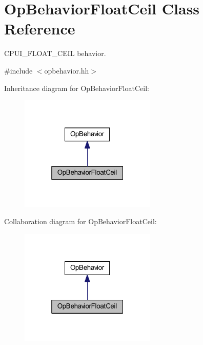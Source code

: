 \hypertarget{class_op_behavior_float_ceil}{}\section{Op\+Behavior\+Float\+Ceil Class Reference}
\label{class_op_behavior_float_ceil}


C\+P\+U\+I\+\_\+\+F\+L\+O\+A\+T\+\_\+\+C\+E\+IL behavior.  




{\ttfamily \#include $<$opbehavior.\+hh$>$}



Inheritance diagram for Op\+Behavior\+Float\+Ceil\+:
\nopagebreak
\begin{figure}[H]
\begin{center}
\leavevmode
\includegraphics[width=184pt]{class_op_behavior_float_ceil__inherit__graph}
\end{center}
\end{figure}


Collaboration diagram for Op\+Behavior\+Float\+Ceil\+:
\nopagebreak
\begin{figure}[H]
\begin{center}
\leavevmode
\includegraphics[width=184pt]{class_op_behavior_float_ceil__coll__graph}
\end{center}
\end{figure}

